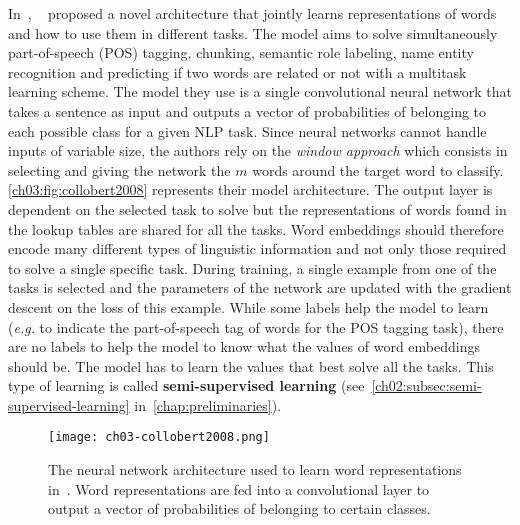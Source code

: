       In~\citeyear{collobert2008unified},
      \citeauthor{collobert2008unified}~\citep{collobert2008unified} proposed a
      novel architecture that jointly learns representations of words and how to
      use them in different tasks. The model aims to solve simultaneously
      part-of-speech (POS) tagging, chunking, semantic role labeling, name
      entity recognition and predicting if two words are related or not with a
      multitask learning scheme. The model they use is a single convolutional
      neural network that takes a sentence as input and outputs a vector of
      probabilities of belonging to each possible class for a given NLP task.
      Since neural networks cannot handle inputs of variable size, the authors
      rely on the \textit{window approach} which consists in selecting and
      giving the network the $m$ words around the target word to classify.
      \autoref{ch03:fig:collobert2008} represents their model architecture. The
      output layer is dependent on the selected task to solve but the
      representations of words found in the lookup tables are shared for all the
      tasks. Word embeddings should therefore encode many different types of
      linguistic information and not only those required to solve a single
      specific task. During training, a single example from one of the tasks is
      selected and the parameters of the network are updated with the gradient
      descent on the loss of this example. While some labels help the model to
      learn (\textit{e.g.} to indicate the part-of-speech tag of words for the
      POS tagging task), there are no labels to help the model to know what the
      values of word embeddings should be. The model has to learn the values
      that best solve all the tasks. This type of learning is called
      \textbf{semi-supervised learning}
      (see~\autoref{ch02:subsec:semi-supervised-learning}
      in~\autoref{chap:preliminaries}). \medskip

      \begin{figure}[h!]
        \centering
        \texttt{[image: ch03-collobert2008.png]}
        \caption[Neural network used to learn word embeddings by
        \citeauthor{collobert2008unified}.] {The neural network architecture
        used to learn word representations in~\citep{collobert2008unified}.
        Word representations are fed into a convolutional layer to output a
        vector of probabilities of belonging to certain classes.}
        \label{ch03:fig:collobert2008}
      \end{figure}

